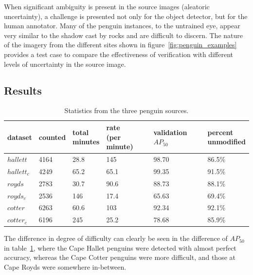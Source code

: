 When significant ambiguity is present in the source images (aleatoric uncertainty), a challenge is presented not only for the object detector, but for the human annotator. Many of the penguin instances, to the untrained eye, appear very similar to the shadow cast by rocks and are difficult to discern. The nature of the imagery from the different sites shown in figure~\ref{fig:penguin_examples} provides a test case to compare the effectiveness of verification with different levels of uncertainty in the source image. 


\subsection{Results}
\label{sec:penguin_results}

\begin{table}[ht!]
  \centering
    \caption{Statistics from the three penguin sources. }
\begin{tabular}{llllll}
dataset     & counted & \shortstack{total  \\ minutes} & \shortstack{rate \\ (per minute)} & \shortstack {validation \\  $AP_{50}$} & \shortstack{percent \\ unmodified} \\
\toprule
$hallett$   & 4164    & 28.8          & 145               & 98.70     & 86.5\%   \\
$hallett_c$ & 4249    & 65.2          & 65.1              & 99.35     & 91.5\%   \\
$royds$     & 2783    & 30.7          & 90.6              & 88.73     & 88.1\%   \\
$royds_c$   & 2536    & 146           & 17.4              & 65.63     & 69.4\%   \\
$cotter$    & 6263    & 60.6          & 103               & 92.34     & 92.1\%   \\
$cotter_c$  & 6196    & 245           & 25.2              & 78.68     & 85.9\%  \\
\bottomrule
\end{tabular}

\label{tab:penguin_statistics}
\end{table}

The difference in degree of difficulty can clearly be seen in the difference of $AP_{50}$ in table~\ref{tab:penguin_statistics}, where the Cape Hallet penguins were detected with almost perfect accuracy, whereas the Cape Cotter penguins were more difficult, and those at Cape Royds were somewhere in-between. 

